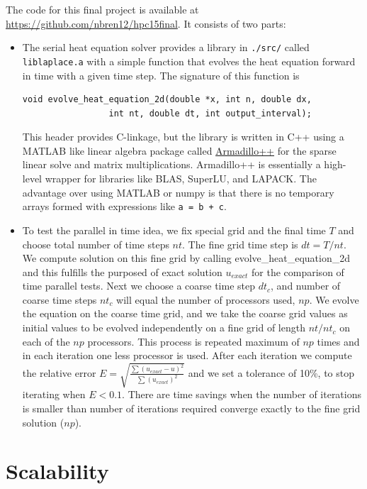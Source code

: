 \documentclass{article}
\begin{document}
The code for this final project is available at \url{https://github.com/nbren12/hpc15final}.
It consists of two parts:
\begin{itemize}
\item The serial heat equation solver provides a library in
  \verb|./src/| called \verb|liblaplace.a| with a simple function that
  evolves the heat equation forward in time with a given time
  step. The signature of this function is
\begin{lstlisting}
void evolve_heat_equation_2d(double *x, int n, double dx,
			     int nt, double dt, int output_interval);
\end{lstlisting}
  
This header provides C-linkage, but the library is written in C++
using a MATLAB like linear algebra package called
\href{http://arma.sourceforge.net/}{Armadillo++} for the sparse linear
solve and matrix multiplications. Armadillo++ is essentially a
high-level wrapper for libraries like BLAS, SuperLU, and LAPACK. The
advantage over using MATLAB or numpy is that there is no temporary
arrays formed with expressions like \verb|a = b + c|.

\item To test the parallel in time idea, we fix special grid and the final time $T$ and choose total number of time steps $nt$. The fine grid time step is $dt = T/nt$. We compute solution on this fine grid by calling evolve\_heat\_equation\_2d and this fulfills the purposed of exact solution $u_{exact}$ for the comparison of time parallel tests. Next we choose a coarse time step $dt_c$, and number of coarse time steps $nt_c$ will equal the number of processors used, $np$. We evolve the equation on the coarse time grid, and we take the coarse grid values as initial values to be evolved independently on a fine grid of length $nt/nt_c$ on each of the $np$ processors. This process is repeated maximum of $np$ times and in each iteration one less processor is used. After each iteration we compute the relative error $E = \sqrt{\frac{\sum{(u_{exact} - u)^2}}{\sum{(u_{exact} )^2}}}$ and we set a tolerance of 10\%, to stop iterating when $E<0.1$. There are time savings when the number of iterations is smaller than number of iterations required converge exactly to the fine grid solution ($np$).

\end{itemize}

\section{Scalability}
\label{sec:scale}
\end{document}
